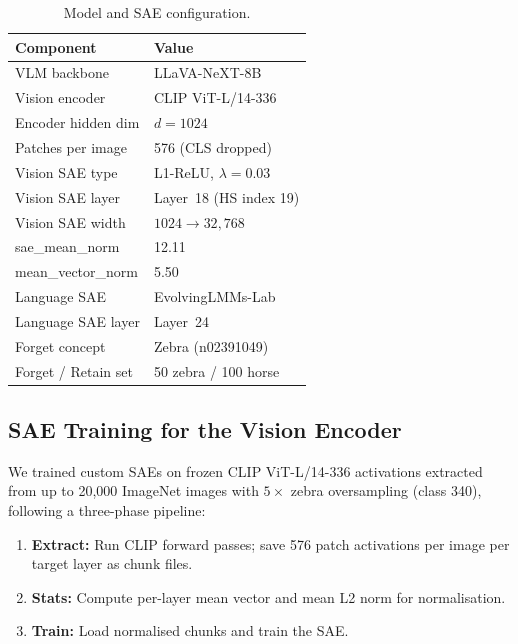 \documentclass{article}
\begin{document}
\begin{table}[ht]
\caption{Model and SAE configuration.}
\label{tab:modelstack}
\vskip 0.15in
\begin{center}
\begin{small}
\begin{tabular}{ll}
\toprule
\textbf{Component} & \textbf{Value} \\
\midrule
VLM backbone               & LLaVA-NeXT-8B \\
Vision encoder             & CLIP ViT-L/14-336 \\
Encoder hidden dim         & $d=1024$ \\
Patches per image          & 576 (CLS dropped) \\
Vision SAE type            & L1-ReLU, $\lambda=0.03$ \\
Vision SAE layer           & Layer~18 (HS index 19) \\
Vision SAE width           & $1024\!\to\!32{,}768$ \\
sae\_mean\_norm            & 12.11 \\
mean\_vector\_norm         & 5.50 \\
Language SAE               & EvolvingLMMs-Lab \\
Language SAE layer         & Layer~24 \\
Forget concept             & Zebra (n02391049) \\
Forget / Retain set        & 50 zebra / 100 horse \\
\bottomrule
\end{tabular}
\end{small}
\end{center}
\vskip -0.1in
\end{table}

\subsection{SAE Training for the Vision Encoder}
\label{sec:sae_training}

We trained custom SAEs on frozen CLIP ViT-L/14-336 activations extracted
from up to 20{,}000 ImageNet images with $5\times$ zebra oversampling
(class 340), following a three-phase pipeline:

\begin{enumerate}\setlength\itemsep{2pt}
  \item \textbf{Extract:} Run CLIP forward passes; save 576
        patch activations per image per target layer as chunk files.
  \item \textbf{Stats:} Compute per-layer mean vector and mean L2 norm
        for normalisation.
  \item \textbf{Train:} Load normalised chunks and train the SAE.
\end{enumerate}
\end{document}
